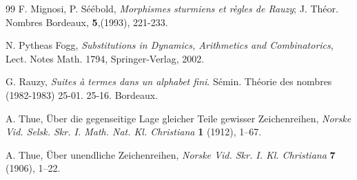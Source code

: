 \documentclass[a4 paper,12pt]{article}
\begin{document}
\begin{thebibliography}{99}
 F. Mignosi, P. S\'e\'ebold, \emph{Morphismes sturmiens et r\`egles de Rauzy}; J. Th\'eor.  Nombres  Bordeaux, \textbf{5},(1993), 221-233.


 N. Pytheas Fogg, \textit{Substitutions in Dynamics, Arithmetics and Combinatorics}, Lect. Notes Math. 1794, Springer-Verlag, 2002.


 G. Rauzy, \emph{Suites \`a termes dans un alphabet fini}. S\'emin.  Th\'eorie des nombres (1982-1983) 25-01. 25-16. Bordeaux.

 A. Thue, \"Uber die gegenseitige Lage gleicher Teile gewisser Zeichenreihen, \textit{Norske Vid. Selsk. Skr. I. Math. Nat. Kl. Christiana} \textbf{1} (1912), 1--67.


 A. Thue, \"Uber unendliche Zeichenreihen, \textit{Norske Vid. Skr. I. Kl. Christiana} \textbf{7} (1906), 1--22.


\end{thebibliography}
\end{document}
